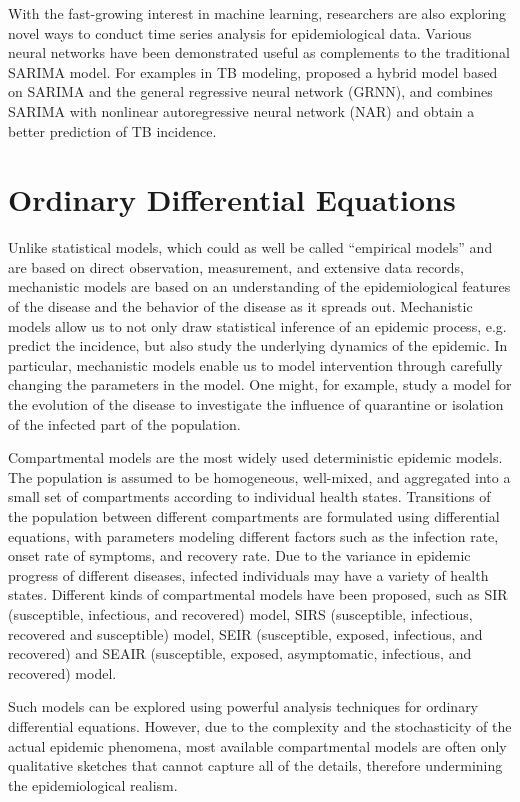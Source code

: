 \documentclass[8pt,twocolumn]{extarticle}
\begin{document}
With the fast-growing interest in machine learning, researchers are also exploring novel ways to conduct time series analysis for epidemiological data. Various neural networks have been demonstrated useful as complements to the traditional SARIMA model. For examples in TB modeling, \cite{HybridModel2013} proposed a hybrid model based on SARIMA and the general regressive neural network (GRNN), and \cite{HybridModel2017} combines SARIMA with nonlinear autoregressive neural network (NAR) and obtain a better prediction of TB incidence.

\section{Ordinary Differential Equations} %
Unlike statistical models, which could as well be called ``empirical models'' and are based on direct observation, measurement, and extensive data records, mechanistic models are based on an understanding of the epidemiological features of the disease and the behavior of the disease as it spreads out. Mechanistic models allow us to not only draw statistical inference of an epidemic process, e.g. predict the incidence, but also study the underlying dynamics of the epidemic. In particular, mechanistic models enable us to model intervention through carefully changing the parameters in the model. One might, for example, study a model for the evolution of the disease to investigate the influence of quarantine or isolation of the infected part of the population. 

Compartmental models are the most widely used deterministic epidemic models. The population is assumed to be homogeneous, well-mixed, and aggregated into a small set of compartments according to individual health states. Transitions of the population between different compartments are formulated using differential equations, with parameters modeling different factors such as the infection rate, onset rate of symptoms, and recovery rate. Due to the variance in epidemic progress of different diseases, infected individuals may have a variety of health states. Different kinds of compartmental models have been proposed, such as SIR (susceptible, infectious, and recovered) model, SIRS (susceptible, infectious, recovered and susceptible) model, SEIR (susceptible, exposed, infectious, and recovered) and SEAIR (susceptible, exposed, asymptomatic, infectious, and recovered) model.

Such models can be explored using powerful analysis techniques for ordinary differential equations. However, due to the complexity and the stochasticity of the actual epidemic phenomena, most available compartmental models are often only qualitative sketches that cannot capture all of the details, therefore undermining the epidemiological realism.
\end{document}
